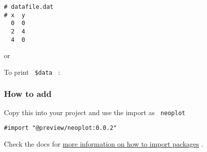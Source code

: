 \begin{verbatim}
# datafile.dat
# x  y
  0  0
  2  4
  4  0
\end{verbatim}

\begin{Shaded}
\begin{Highlighting}[]
\NormalTok{    \textasciigrave{}\textasciigrave{}\textasciigrave{}}
\NormalTok{)}
\end{Highlighting}
\end{Shaded}

or

\begin{Shaded}
\begin{Highlighting}[]
\NormalTok{)}
\end{Highlighting}
\end{Shaded}

To print \texttt{\ \$data\ } :

\begin{Shaded}
\begin{Highlighting}[]
\end{Highlighting}
\end{Shaded}

\subsubsection{How to add}\label{how-to-add}

Copy this into your project and use the import as \texttt{\ neoplot\ }

\begin{verbatim}
#import "@preview/neoplot:0.0.2"
\end{verbatim}



Check the docs for
\href{https://typst.app/docs/reference/scripting/\#packages}{more
information on how to import packages} .

